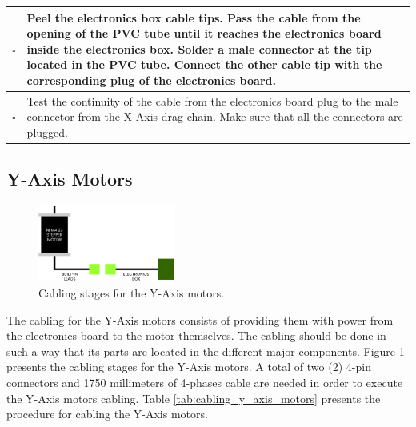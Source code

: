 \documentclass{article}
\begin{document}
\begin{singlespace}
\begin{xltabular}{\textwidth}{|c|X|}
    $\square$ & Peel the  electronics box cable tips. Pass the cable from the opening of the PVC tube until it reaches the electronics board inside the electronics box. Solder a male connector at the tip located in the PVC tube. Connect the other cable tip with the corresponding plug of the electronics board. \\ \hline
    $\square$ & Test the continuity of the cable from the electronics board plug to the male connector from the X-Axis drag chain. Make sure that all the connectors are plugged. \\ \hline 
\end{xltabular}
\end{singlespace}

\subsection{Y-Axis Motors}
\begin{figure}[H]
    \centering
    \includegraphics[width=0.4\textwidth]{images/cabling/y_axis_motors_cabling.pdf}
    \caption{Cabling stages for the Y-Axis motors.}
    \label{fig:cabling_y_axis_motors}
\end{figure}
The cabling for the Y-Axis motors consists of providing them with power from the electronics board to the motor themselves. The cabling should be done in such a way that its parts are located in the different major components. Figure \ref{fig:cabling_y_axis_motors} presents the cabling stages for the Y-Axis motors. A total of two (2) 4-pin connectors and 1750 millimeters of 4-phases cable are needed in order to execute the Y-Axis motors cabling. Table \ref{tab:cabling_y_axis_motors} presents the procedure for cabling the Y-Axis motors.
\end{document}
